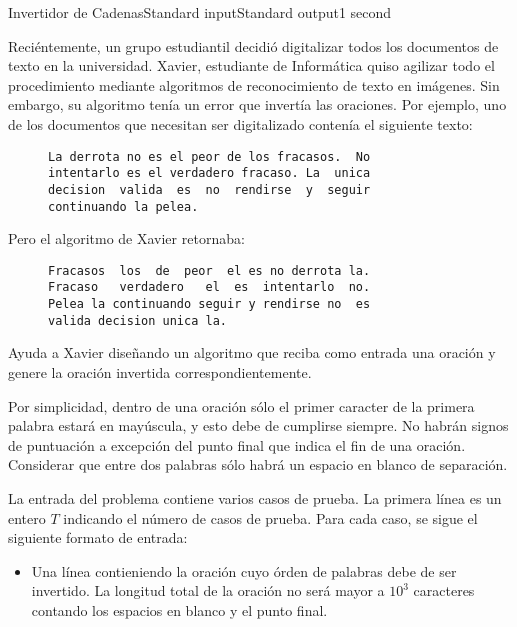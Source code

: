 \begin{problem}{Invertidor de Cadenas}{Standard input}{Standard output}{1 second}{}


Reciéntemente, un grupo estudiantil decidió digitalizar todos los documentos de texto en la universidad. Xavier, estudiante de Informática quiso agilizar todo el procedimiento mediante algoritmos de reconocimiento de texto en imágenes. Sin embargo, su algoritmo tenía un error que invertía las oraciones. Por ejemplo, uno de los documentos que necesitan ser digitalizado contenía el siguiente texto:

\begin{figure}[htb]
\centering
\begin{BVerbatim}
La derrota no es el peor de los fracasos.  No
intentarlo es el verdadero fracaso. La  unica 
decision  valida  es  no  rendirse  y  seguir
continuando la pelea.
\end{BVerbatim}
\end{figure}

Pero el algoritmo de Xavier retornaba:

\begin{figure}[htb]
\centering
\begin{BVerbatim}
Fracasos  los  de  peor  el es no derrota la.
Fracaso   verdadero   el  es  intentarlo  no.
Pelea la continuando seguir y rendirse no  es
valida decision unica la.
\end{BVerbatim}
\end{figure}

Ayuda a Xavier diseñando un algoritmo que reciba como entrada una oración y genere la oración invertida correspondientemente.

Por simplicidad, dentro de una oración sólo el primer caracter de la primera palabra estará en mayúscula, y esto debe de cumplirse siempre. No habrán signos de puntuación a excepción del punto final que indica el fin de una oración. Considerar que entre dos palabras sólo habrá un espacio en blanco de separación.

\InputFile
La entrada del problema contiene varios casos de prueba. La primera línea es un entero $T$ indicando el número de casos de prueba. Para cada caso, se sigue el siguiente formato de entrada:

\begin{itemize}
\item Una línea contieniendo la oración cuyo órden de palabras debe de ser invertido. La longitud total de la oración no será mayor a $10^3$ caracteres contando los espacios en blanco y el punto final.
\end{itemize}


\end{problem}
